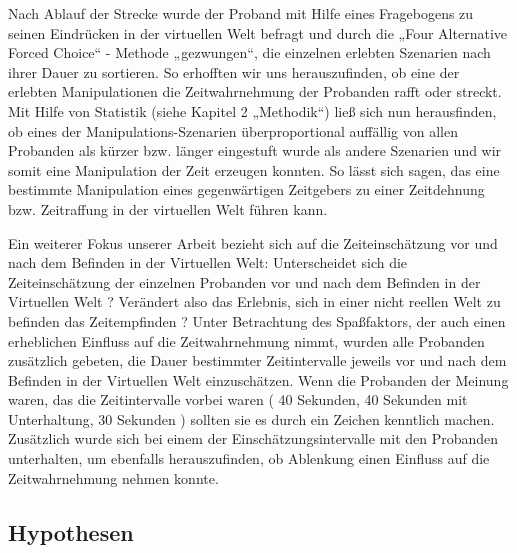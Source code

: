 \documentclass{Paper}
\begin{document}
Nach Ablauf der Strecke wurde der Proband mit Hilfe eines Fragebogens zu seinen Eindrücken in der virtuellen Welt befragt und durch die „Four Alternative Forced Choice“ - Methode „gezwungen“, die einzelnen erlebten Szenarien nach ihrer Dauer zu sortieren. So erhofften wir uns herauszufinden, ob eine der erlebten Manipulationen die Zeitwahrnehmung der Probanden rafft oder streckt. Mit Hilfe von Statistik (siehe Kapitel 2 „Methodik“) ließ sich nun herausfinden, ob eines der Manipulations-Szenarien überproportional auffällig von allen Probanden als kürzer bzw. länger eingestuft wurde als andere Szenarien und wir somit eine Manipulation der Zeit erzeugen konnten. So lässt sich sagen, das eine bestimmte Manipulation eines gegenwärtigen Zeitgebers zu einer Zeitdehnung bzw. Zeitraffung in der virtuellen Welt führen kann.
\par
Ein weiterer Fokus unserer Arbeit bezieht sich auf die Zeiteinschätzung vor und nach dem Befinden in der Virtuellen Welt:
Unterscheidet sich die Zeiteinschätzung der einzelnen Probanden vor und nach dem Befinden in der Virtuellen Welt ? Verändert also das Erlebnis, sich in einer nicht reellen Welt zu befinden das Zeitempfinden ?
Unter Betrachtung des Spaßfaktors, der auch einen erheblichen Einfluss auf die Zeitwahrnehmung nimmt, wurden alle Probanden zusätzlich gebeten, die Dauer bestimmter Zeitintervalle jeweils vor und nach dem Befinden in der Virtuellen Welt einzuschätzen. Wenn die Probanden der Meinung waren, das die Zeitintervalle vorbei waren ( 40 Sekunden, 40 Sekunden mit Unterhaltung, 30 Sekunden ) sollten sie es durch ein Zeichen kenntlich machen. Zusätzlich wurde sich bei einem der Einschätzungsintervalle mit den Probanden unterhalten, um ebenfalls herauszufinden, ob Ablenkung einen Einfluss auf die Zeitwahrnehmung nehmen konnte.


\subsection{Hypothesen}
\end{document}
